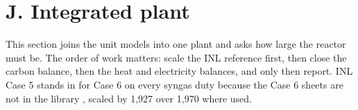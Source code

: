 \providecommand{\cChMass}{0.79}
\providecommand{\cCoolHW}{21.7}
\providecommand{\cCoolKO}{5.8}
\providecommand{\cDfSlip}{161.8}
\providecommand{\cDiceCompPct}{27}
\providecommand{\cDiceTph}{70.2}
\providecommand{\cEtaTh}{0.67}
\providecommand{\cMng}{17.18}
\providecommand{\cRlowScreen}{163.0}
\providecommand{\cVolScale}{0.6891}
\providecommand{\cWalkAb}{220.4}
\providecommand{\cWalkAc}{225.3}
\providecommand{\cWalkAd}{242.4}
\providecommand{\cWalkAe}{242.8}
\providecommand{\cWalkAf}{\vQRA}
\providecommand{\cYm}{2.21}
\providecommand{\cYv}{3.82}
\providecommand{\vAcFiveBS}{165.6}
\providecommand{\vAcFiveBT}{189{}.8}
\providecommand{\vAcFiveNeedBS}{140.8}
\providecommand{\vAcFiveNeedBT}{161.7}
\providecommand{\vCapA}{1{,}655.1}
\providecommand{\vEcomp}{4.25}
\providecommand{\vEfans}{0.77}
\providecommand{\vEpump}{0.87}
\providecommand{\vEpurge}{4.32}
\providecommand{\vEpurgeNo}{3.89}
\providecommand{\vErowCool}{0.068}
\providecommand{\vErowPsa}{0.012}
\providecommand{\vErowRef}{0.82}
\providecommand{\vErowSteam}{0.20}
\providecommand{\vErowWater}{1.02}
\providecommand{\vHkgB}{8{,}988}
\providecommand{\vImpA}{22.5}
\providecommand{\vImpB}{0.0}
\providecommand{\vNGxB}{23.23}
\providecommand{\vPlantCapRes}{0.9038}
\providecommand{\vPsaFeed}{10{,}214}
\providecommand{\vPsaRej}{1{,}226}
\providecommand{\vRahn}{204.0}
\providecommand{\vRahnHeld}{202.9}
\providecommand{\vRbest}{155.8}
\providecommand{\vRhigh}{214.9}
\providecommand{\vStackExp}{16.76}
\providecommand{\vStackSel}{12.73}
\providecommand{\vStackSyn}{7.69}
\providecommand{\vTgB}{471.7}
\providecommand{\vTgInlA}{495.6}
\providecommand{\vTubeInlA}{2{,}157.2}
\providecommand{\vWalkFive}{166.2}
\providecommand{\vWalkFour}{165.9}
\providecommand{\vWalkOne}{140.8}
\providecommand{\vWalkSix}{\vQRB}
\providecommand{\vWalkThree}{154.3}
\providecommand{\vWalkTwo}{150.6}
\providecommand{\vWalkZero}{206.0}
\section{J. Integrated plant}\label{sec:J}
This section joins the unit models into one plant and asks how large the reactor must be. The order of work matters: scale the INL reference first, then close the carbon balance, then the heat and electricity balances, and only then report. INL Case 5 stands in for Case 6 on every syngas duty because the Case 6 sheets are not in the library , scaled by 1,927 over 1,970 where used.

